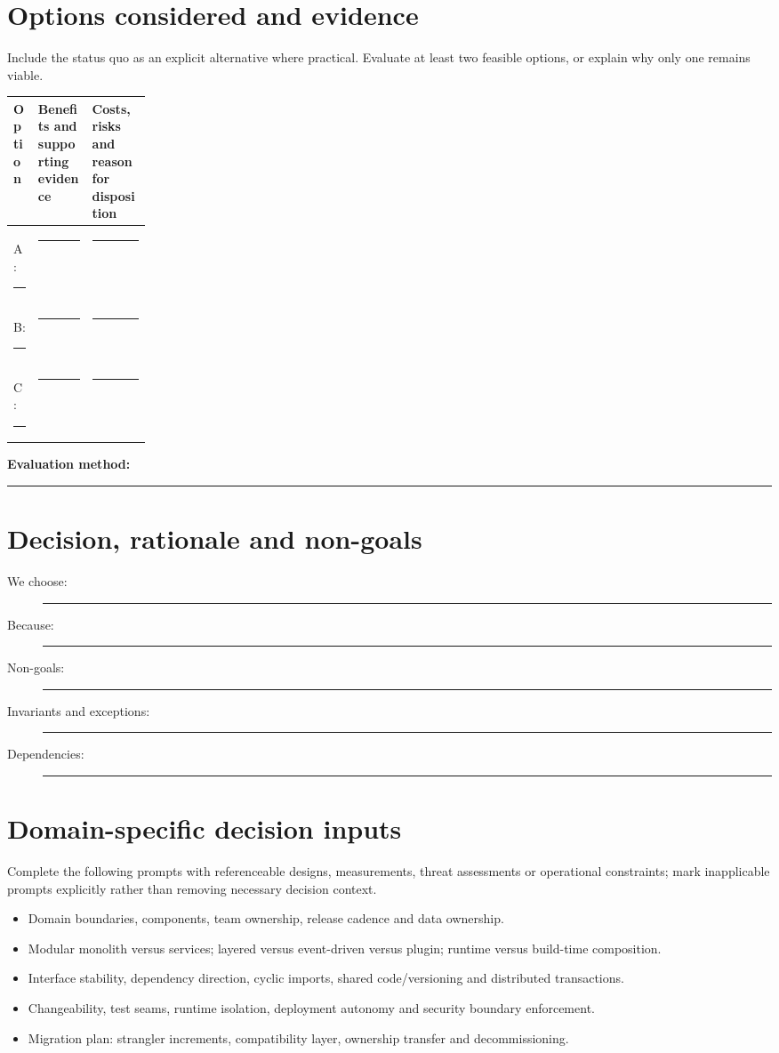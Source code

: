 \documentclass[11pt,letterpaper]{article}
\newcommand{\BlankResponse}{\rule[-0.4em]{0pt}{2em}\rule{0.65\linewidth}{0.4pt}}
\begin{document}
\section{Options considered and evidence}
Include the status quo as an explicit alternative where practical. Evaluate
at least two feasible options, or explain why only one remains viable.
\par\noindent\begin{tabularx}{\linewidth}{@{}>{\raggedright\arraybackslash}p{0.18\linewidth}>{\raggedright\arraybackslash}X >{\raggedright\arraybackslash}X@{}}
\toprule
\textbf{Option} & \textbf{Benefits and supporting evidence} & \textbf{Costs, risks and reason for disposition}\\
\midrule
A: \BlankResponse & \BlankResponse & \BlankResponse\\
B: \BlankResponse & \BlankResponse & \BlankResponse\\
C: \BlankResponse & \BlankResponse & \BlankResponse\\
\bottomrule
\end{tabularx}\par

\noindent\textbf{Evaluation method:} \BlankResponse

\section{Decision, rationale and non-goals}
\begin{description}
\item[We choose:] \BlankResponse
\item[Because:] \BlankResponse
\item[Non-goals:] \BlankResponse
\item[Invariants and exceptions:] \BlankResponse
\item[Dependencies:] \BlankResponse
\end{description}

\section{Domain-specific decision inputs}
Complete the following prompts with referenceable designs, measurements,
threat assessments or operational constraints; mark inapplicable prompts
explicitly rather than removing necessary decision context.
\begin{itemize}
\item Domain boundaries, components, team ownership, release cadence and data ownership.
\item Modular monolith versus services; layered versus event-driven versus plugin; runtime versus build-time composition.
\item Interface stability, dependency direction, cyclic imports, shared code/versioning and distributed transactions.
\item Changeability, test seams, runtime isolation, deployment autonomy and security boundary enforcement.
\item Migration plan: strangler increments, compatibility layer, ownership transfer and decommissioning.
\end{itemize}
\end{document}
